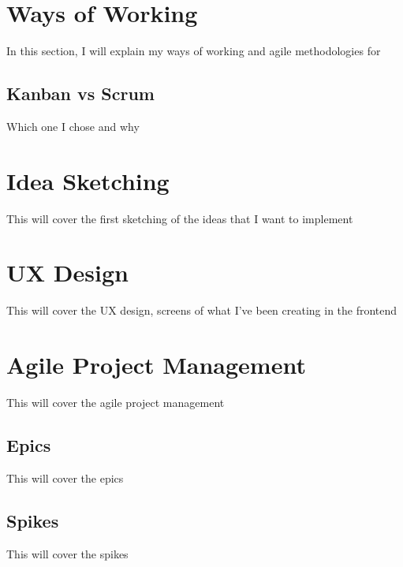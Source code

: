 \section{Ways of Working}
\label{s:Ways-of-Working}
In this section, I will explain my ways of working and agile methodologies for

\subsection{Kanban vs Scrum}
\label{s:Kanban-vs-Scrum}
Which one I chose and why

\section{Idea Sketching}
\label{s:Idea-Sketching}
This will cover the first sketching of the ideas that I want to implement

\section{UX Design}
\label{s:UX-Design}
This will cover the UX design, screens of what I've been creating in the frontend

\section{Agile Project Management}
\label{s:Agile-Project-Management}
This will cover the agile project management

\subsection{Epics}
\label{s:Epic}
This will cover the epics

\subsection{Spikes}
\label{s:Spikes}
This will cover the spikes
